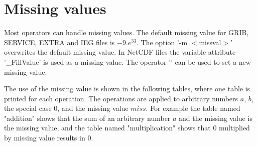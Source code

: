 \section{Missing values}

Most operators can handle missing values.
The default missing value for GRIB, SERVICE, EXTRA and IEG files is $-9.e^{33}$. 
The {\CDO} option '-m $<$missval$>$' overwrites the default missing value.
In NetCDF files the variable attribute '\_FillValue' is used as a missing value.
The operator '' can be used to set a new missing value.

The {\CDO} use of the missing value is shown in the following tables,
where one table is printed for each operation.
The operations are applied to arbitrary numbers $a$, $b$, the special case $0$,
and the missing value $miss$.
For example the table named "addition" shows that the sum of an
arbitrary number $a$ and the missing value is the missing value,
and the table named "multiplication" shows that $0$ multiplied by missing
value results in $0$.


